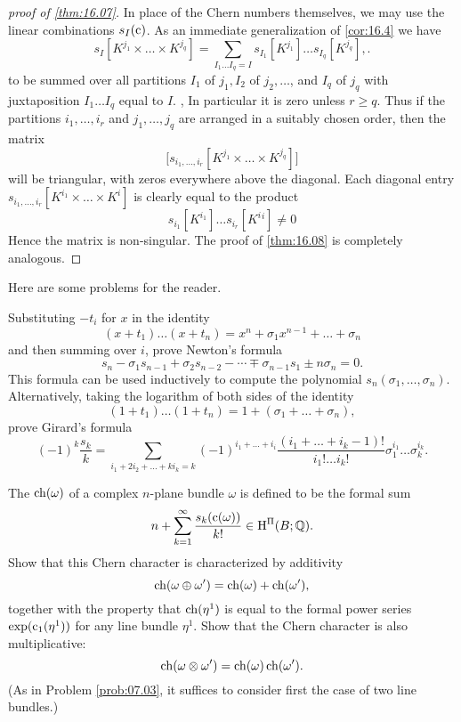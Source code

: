 \documentclass[../main]{subfiles}
\begin{document}
\begin{proof}[proof of \ref{thm:16.07}]
In place of the Chern numbers themselves, we may use the linear combinations $s_{I}(\operatorname{c})$. As an immediate generalization of \ref{cor:16.4} we have
\[
s_{I}[K^{j_{1}} \times \ldots \times K^{j_{q}}]=\sum_{I_{1} \ldots I_{q}=I} s_{I_{1}}[K^{j_{1}}] \ldots s_{I_{q}}[K^{j_{q}}],.
\]
to be summed over all partitions $I_{1}$ of $j_{1}, I_{2}$ of $j_{2}, \ldots$, and $I_{q}$ of $j_{q}$ with juxtaposition $I_{1} \ldots I_{q}$ equal to $I$. , In particular it is zero unless $r \geq q$. Thus if the partitions $i_{1}, \ldots, i_{r}$ and $j_{1}, \ldots, j_{q}$ are arranged in a suitably chosen order, then the matrix
\[
\Big[s_{i_{1}, \ldots, i_{r}}[K^{j_{1}} \times \ldots \times K^{j_{q}}]\Big]
\]
will be triangular, with zeros everywhere above the diagonal. Each diagonal entry $s_{i_{1}, \ldots, i_{r}}[K^{i_{1}} \times \ldots \times K^{i}]$ is clearly equal to the product
\[
s_{i_{1}}[K^{i_{1}}] \ldots s_{i_{r}}[K^{i}{ }^{i}] \neq 0
\]
Hence the matrix is non-singular. The proof of \ref{thm:16.08} is completely analogous.\end{proof}

Here are some problems for the reader.

\begin{problem}\label{prob:16.A}
Substituting $-t_{i}$ for $x$ in the identity \[(x+t_{1}) \ldots(x+t_{n})=x^{n}+\sigma_{1} x^{n-1}+\ldots+\sigma_{n}\] and then summing over $i$, prove Newton's formula
\[
s_{n}-\sigma_{1} s_{n-1}+\sigma_{2} s_{n-2}-\cdots \mp \sigma_{n-1} s_{1} \pm n \sigma_{n}=0 .
\]
This formula can be used inductively to compute the polynomial $s_{n}(\sigma_{1}, \ldots, \sigma_{n})$. Alternatively, taking the logarithm of both sides of the identity \[(1+t_{1}) \ldots(1+t_{n})=1+(\sigma_{1}+\ldots+\sigma_{n}),\] prove Girard's formula
\[
(-1)^{k} \dfrac{s_k}{k}=\sum_{i_{1}+2 i_{2}+\ldots+ki_{k}=k}(-1)^{i_{1}+\ldots+i_{i}} \frac{(i_{1}+\ldots+i_{k}-1) !}{i_{1} ! \ldots i_{k} !} \sigma_{1}^{i_{1}} \ldots \sigma_{k}^{i_{k}} .
\]
\end{problem}

\begin{problem}\label{prob:16.B}
The  $\operatorname{ch}(\omega)$ of a complex $n$-plane bundle $\omega$ is defined to be the formal sum
\[
n+\sum_{k=1}^{\infty} \dfrac{s_{k}(\operatorname{c}(\omega)) }{k!} \in \operatorname{H}^{\Pi}(B ; \mathbb{Q}) .
\]
Show that this Chern character is characterized by additivity
\[
\operatorname{ch}(\omega \oplus \omega^{\prime})=\operatorname{ch}(\omega)+\operatorname{ch}(\omega^{\prime}),
\]
together with the property that $\operatorname{ch}(\eta^{1})$ is equal to the formal power series $\exp (\operatorname{c}_{1}(\eta^{1}))$ for any line bundle $\eta^{1}$. Show that the Chern character is also multiplicative:
\[
\operatorname{ch}(\omega \otimes \omega^{\prime})=\operatorname{ch}(\omega) \operatorname{ch}(\omega^{\prime}) .
\]
(As in Problem \ref{prob:07.03}, it suffices to consider first the case of two line bundles.)
\end{problem}
\end{document}
